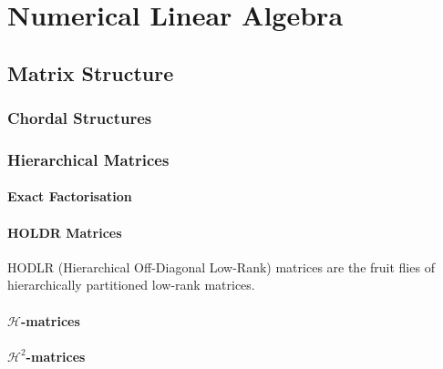 \chapter{Numerical Linear Algebra}
\localtableofcontents

\section{Matrix Structure}

\subsection{Chordal Structures}



\subsection{Hierarchical Matrices}


\subsubsection{Exact Factorisation}

\subsubsection{HOLDR Matrices}

HODLR (Hierarchical Off-Diagonal Low-Rank) matrices are the fruit
flies of hierarchically partitioned low-rank matrices.

\subsubsection{$\mathcal{H}$-matrices}

\subsubsection{$\mathcal{H}^2$-matrices}